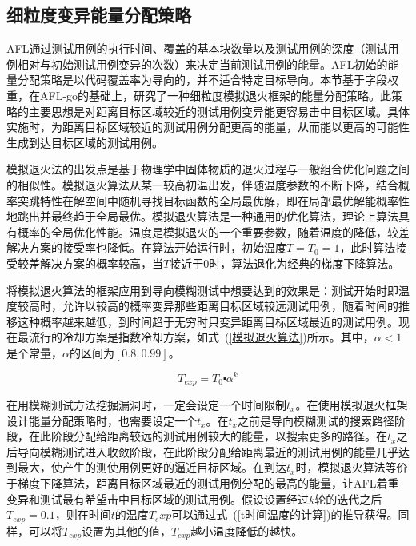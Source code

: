 \subsection{细粒度变异能量分配策略}

AFL通过测试用例的执行时间、覆盖的基本块数量以及测试用例的深度（测试用例相对与初始测试用例变异的次数）来决定当前测试用例的能量。AFL初始的能量分配策略是以代码覆盖率为导向的，并不适合特定目标导向。本节基于字段权重，在AFL-go的基础上，研究了一种细粒度模拟退火框架的能量分配策略。此策略的主要思想是对距离目标区域较近的测试用例变异能更容易击中目标区域。具体实施时，为距离目标区域较近的测试用例分配更高的能量，从而能以更高的可能性生成到达目标区域的测试用例。

模拟退火法的出发点是基于物理学中固体物质的退火过程与一般组合优化问题之间的相似性。模拟退火算法从某一较高初温出发，伴随温度参数的不断下降，结合概率突跳特性在解空间中随机寻找目标函数的全局最优解，即在局部最优解能概率性地跳出并最终趋于全局最优。模拟退火算法是一种通用的优化算法，理论上算法具有概率的全局优化性能。温度是模拟退火的一个重要参数，随着温度的降低，较差解决方案的接受率也降低。在算法开始运行时，初始温度$T=T_0=1$，此时算法接受较差解决方案的概率较高，当$T$接近于0时，算法退化为经典的梯度下降算法。

将模拟退火算法的框架应用到导向模糊测试中想要达到的效果是：测试开始时即温度较高时，允许以较高的概率变异那些距离目标区域较远测试用例，随着时间的推移这种概率越来越低，到时间趋于无穷时只变异距离目标区域最近的测试用例。现在最流行的冷却方案是指数冷却方案，如式~(\ref{模拟退火算法})所示。其中，$\alpha<1$是个常量，$\alpha$的区间为$[0.8,0.99]$。

\begin{equation}\label{模拟退火算法}
T_{exp} = T_0 \centerdot \alpha^{k}
\end{equation}

在用模糊测试方法挖掘漏洞时，一定会设定一个时间限制$t_x$。在使用模拟退火框架设计能量分配策略时，也需要设定一个$t_x$。在$t_x$之前是导向模糊测试的搜索路径阶段，在此阶段分配给距离较远的测试用例较大的能量，以搜索更多的路径。在$t_x$之后导向模糊测试进入收敛阶段，在此阶段分配给距离最近的测试用例的能量几乎达到最大，使产生的测使用例更好的逼近目标区域。在到达$t_x$时，模拟退火算法等价于梯度下降算法，距离目标区域最近的测试用例分配的最高的能量，让AFL着重变异和测试最有希望击中目标区域的测试用例。假设设置经过$k$轮的迭代之后$T_{exp}=0.1$，则在时间$t$的温度$T_exp$可以通过式~(\ref{t时间温度的计算})的推导获得。同样，可以将$T_{exp}$设置为其他的值，$T_{exp}$越小温度降低的越快。

